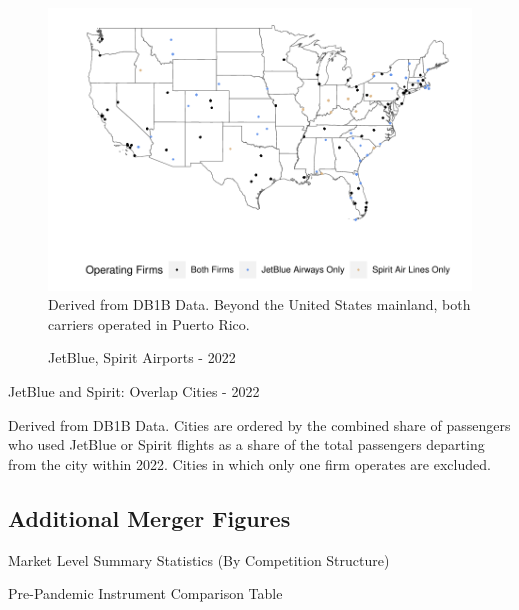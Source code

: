 \documentclass{article}
\begin{document}
\begin{appendices}
\begin{figure}
	\caption{JetBlue, Spirit Airports - 2022}
	\label{fig:JBSpirit_Airports_2022}
	\includegraphics[width = \linewidth]{Map_Mainland_Both_2022.pdf}
	\footnotesize{Derived from DB1B Data. Beyond the United States mainland, both carriers operated in Puerto Rico.}
\end{figure}


	\begin{table}
		\caption{JetBlue and Spirit: Overlap Cities - 2022}
		\label{tab:KeyCities}
		
		\footnotesize{Derived from DB1B Data. Cities are ordered by the combined share of passengers who used JetBlue or Spirit flights as a share of the total passengers departing from the city within 2022. Cities in which only one firm operates are excluded.}
	\end{table}
	
	\FloatBarrier
	
\FloatBarrier
    \subsection{Additional Merger Figures}
    \begin{table}
        \caption{Market Level Summary Statistics (By Competition Structure)}
        \label{fig:Market_Type_Summary}
                  \vspace{-15mm}
        \begin{center}
        
        \end{center}
    \end{table}
    
    \begin{table}
        \caption{Pre-Pandemic Instrument Comparison Table}
        \label{tab:Instrument_Compare_Pre}
        \resizebox{\linewidth}{!}{%

}
\end{table}
\end{appendices}
\end{document}
